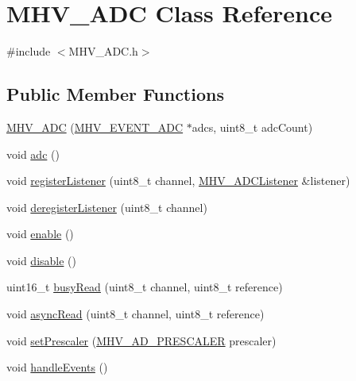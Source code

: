 \hypertarget{class_m_h_v___a_d_c}{
\section{\-M\-H\-V\-\_\-\-A\-D\-C \-Class \-Reference}
\label{class_m_h_v___a_d_c}
}


{\ttfamily \#include $<$\-M\-H\-V\-\_\-\-A\-D\-C.\-h$>$}

\subsection*{\-Public \-Member \-Functions}
\begin{DoxyCompactItemize}
\item 
\hyperlink{class_m_h_v___a_d_c_a99020253bc4e308715108a37ff317471}{\-M\-H\-V\-\_\-\-A\-D\-C} (\hyperlink{_m_h_v___a_d_c_8h_a21c373c52cc2836a0010981c9b63d1f9}{\-M\-H\-V\-\_\-\-E\-V\-E\-N\-T\-\_\-\-A\-D\-C} $\ast$adcs, uint8\-\_\-t adc\-Count)
\item 
void \hyperlink{class_m_h_v___a_d_c_a62548b3bbb7b2e916a5adba15d40723f}{adc} ()
\item 
void \hyperlink{class_m_h_v___a_d_c_a6ace5a8dbe234ab2f5c92a60fb4c737c}{register\-Listener} (uint8\-\_\-t channel, \hyperlink{class_m_h_v___a_d_c_listener}{\-M\-H\-V\-\_\-\-A\-D\-C\-Listener} \&listener)
\item 
void \hyperlink{class_m_h_v___a_d_c_afccc455d24da99698a91b10710fcaf36}{deregister\-Listener} (uint8\-\_\-t channel)
\item 
void \hyperlink{class_m_h_v___a_d_c_a5578b8f74a62fbf4207dd10a6d3da4f0}{enable} ()
\item 
void \hyperlink{class_m_h_v___a_d_c_ad7eb5acfd0484c0213dcfb6851de2052}{disable} ()
\item 
uint16\-\_\-t \hyperlink{class_m_h_v___a_d_c_ad0b41df30ca6f91fb79c64dd85f24d78}{busy\-Read} (uint8\-\_\-t channel, uint8\-\_\-t reference)
\item 
void \hyperlink{class_m_h_v___a_d_c_a4b3f1fb04a289201287c38ef57929fb1}{async\-Read} (uint8\-\_\-t channel, uint8\-\_\-t reference)
\item 
void \hyperlink{class_m_h_v___a_d_c_a29943f22942857e41e6c060ec7238765}{set\-Prescaler} (\hyperlink{_m_h_v___a_d_8h_a1c5416b19545e0c8422dbe381d6df18f}{\-M\-H\-V\-\_\-\-A\-D\-\_\-\-P\-R\-E\-S\-C\-A\-L\-E\-R} prescaler)
\item 
void \hyperlink{class_m_h_v___a_d_c_a431d2be95d566a7595691a0ecb40ba54}{handle\-Events} ()
\end{DoxyCompactItemize}
